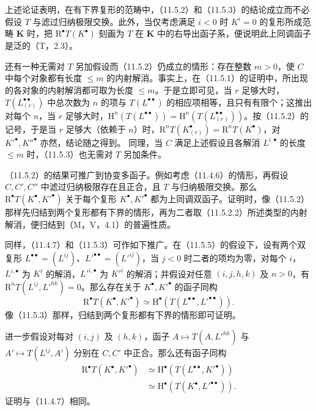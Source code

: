 上述论证表明，在有下界复形的范畴中，（11.5.2）和（11.5.3）的结论成立而不必假设 $T$ 与滤过归纳极限交换。此外，当仅考虑满足 $i<0$ 时 $K^i=0$ 的复形所成范畴 $\mathbf K$ 时，把 $\mathrm R^\bullet T(K^\bullet)$ 刻画为 $T$ 在 $\mathbf K$ 中的右导出函子系，便说明此上同调函子是泛的（T，2.3）。

还有一种无需对 $T$ 另加假设而（11.5.2）仍成立的情形：存在整数 $m>0$，使 $C$ 中每个对象都有长度 $\leq m$ 的内射解消。事实上，在（11.5.1）的证明中，所出现的各对象的内射解消都可取为长度 $\leq m$。于是立即可见，当 $r$ 足够大时，$T(L_{(r)}^{\bullet\bullet})$ 中总次数为 $n$ 的项与 $T(L^{\bullet\bullet})$ 的相应项相等，且只有有限个；这推出对每个 $n$，当 $r$ 足够大时，$\mathrm H^n(T(L^{\bullet\bullet}))=\mathrm H^n(T(L_{(r)}^{\bullet\bullet}))$。按（11.5.2）的记号，于是当 $r$ 足够大（依赖于 $n$）时，$\mathrm R^nT(K_{(r)}^\bullet)=\mathrm R^nT(K^\bullet)$，对 $K'^\bullet,K''^\bullet$ 亦然，结论随之得到。
同理，当 $C$ 满足上述假设且各解消 $L^{i,\bullet}$ 的长度 $\leq m$ 时，（11.5.3）也无需对 $T$ 另加条件。

（11.5.2）的结果可推广到协变多函子。例如考虑（11.4.6）的情形，再假设 $C,C',C''$ 中滤过归纳极限存在且正合，且 $T$ 与归纳极限交换。那么 $\mathrm R^\bullet T(K^\bullet,K'^\bullet)$ 关于每个复形 $K^\bullet,K'^\bullet$ 都为上同调双函子。证明时，像（11.5.2）那样先归结到两个复形都有下界的情形，再为二者取（11.5.2.2）所述类型的内射解消，便归结到（M，V，4.1）的普遍性质。

同样，（11.4.7）和（11.5.3）可作如下推广。在（11.5.5）的假设下，设有两个双复形 $L^{\bullet\bullet}=(L^{ij})$、$L'^{\bullet\bullet}=(L'^{ij})$，当 $j<0$ 时二者的项均为零，对每个 $i$，$L^{i,\bullet}$ 为 $K^i$ 的解消，$L'^{i,\bullet}$ 为 $K'^i$ 的解消；并假设对任意 $(i,j,h,k)$ 及 $n>0$，有 $\mathrm R^nT(L^{ij},L'^{hk})=0$。那么存在关于 $K^\bullet,K'^\bullet$ 的函子同构
\begin{equation}\tag{11.5.6.1}
\mathrm R^\bullet T(K^\bullet,K'^\bullet)\simeq\mathrm H^\bullet(T(L^{\bullet\bullet},L'^{\bullet\bullet})).
\end{equation}
像（11.5.3）那样，归结到两个复形都有下界的情形即可证明。

进一步假设对每对 $(i,j)$ 及 $(h,k)$，函子 $A\mapsto T(A,L'^{hk})$ 与 $A'\mapsto T(L^{ij},A')$ 分别在 $C,C'$ 中正合。那么还有函子同构
\begin{equation}\tag{11.5.6.2}
\begin{aligned}
\mathrm R^\bullet T(K^\bullet,K'^\bullet)
&\simeq\mathrm H^\bullet(T(L^{\bullet\bullet},K'^\bullet))\\
&\simeq\mathrm H^\bullet(T(K^\bullet,L'^{\bullet\bullet})).
\end{aligned}
\end{equation}
证明与（11.4.7）相同。

